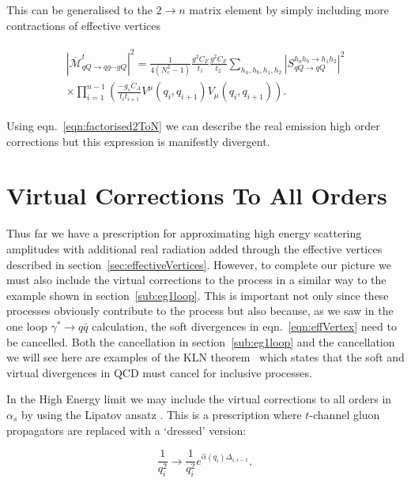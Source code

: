 	This can be generalised to the $2\rightarrow n$ matrix element by simply including more
	contractions of effective vertices

	\begin{align}
	\begin{split}
		|\overline{\mathcal{M}}^t_{qQ\rightarrow qg\cdots gQ}|^2 = \frac{1}{4(N_c^2-1)}
		\frac{g^2C_F}{t_1}\frac{g^2C_F}{t_2} \sum_{h_a, h_b, h_1, h_2}
		|S_{qQ\rightarrow qQ}^{h_ah_b\rightarrow h_1h_2}|^2\\
		\times\prod_{i=1}^{n-1}\left(\frac{-g_sC_A}{t_it_{i+1}}V^\mu(q_i, q_{i+1})V_\mu(q_i, q_{i+1})\right).
		\label{eqn:factorised2ToN}
	\end{split}
	\end{align}

	Using eqn.~\eqref{eqn:factorised2ToN} we can describe the real emission high order
	corrections but this expression is manifestly divergent.

\section{Virtual Corrections To All Orders}
	\label{sub:virtuals}

	Thus far we have a prescription for approximating high energy scattering amplitudes with additional
	real radiation added through the effective vertices described in section~\eqref{sec:effectiveVertices}.
	However, to complete our picture we must also include the virtual corrections to the process in
	a similar way to the example shown in section~\eqref{sub:eg1loop}.  This is important
	not only since these processes obviously contribute to the process but also because, as we saw in
	the one loop $\gamma^*\to q\bar{q}$ calculation, the soft divergences in eqn.~\eqref{eqn:effVertex}
	need to be cancelled.  Both the cancellation in section~\eqref{sub:eg1loop} and the cancellation
	we will see here are examples of the KLN theorem~\cite{mutaBook} which states that the soft and virtual
	divergences in QCD must cancel for inclusive processes.

	In the High Energy limit we may include the virtual corrections to all orders in $\alpha_s$ by using
	the Lipatov ansatz \cite{Kuraev:1976ge}.  This is a prescription where $t$-channel gluon propagators
	are replaced with a `dressed' version:

	\begin{equation}
		\frac{1}{q_i^2}\rightarrow\frac{1}{q_i^2}e^{\hat{\alpha}(q_i)\Delta_{i,i-1}},
		\label{eqn:lipAns}
	\end{equation}

